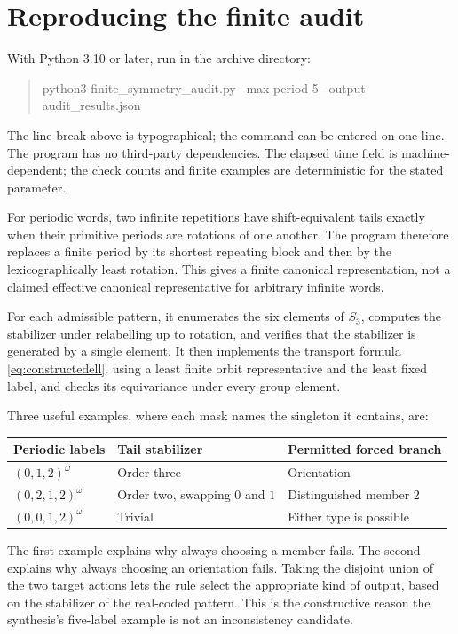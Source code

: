 \documentclass[11pt,letterpaper]{article}
\theoremstyle{definition}
\numberwithin{equation}{section}
\begin{document}
\section{Reproducing the finite audit}\label{app:audit}

With Python 3.10 or later, run in the archive directory:
\begin{quote}\ttfamily\small
python3 finite\_symmetry\_audit.py --max-period 5\newline
\hspace*{1em}--output audit\_results.json
\end{quote}
The line break above is typographical; the command can be entered on one line. The program has no third-party dependencies. The elapsed time field is machine-dependent; the check counts and finite examples are deterministic for the stated parameter.

For periodic words, two infinite repetitions have shift-equivalent tails exactly when their primitive periods are rotations of one another. The program therefore replaces a finite period by its shortest repeating block and then by the lexicographically least rotation. This gives a finite canonical representation, not a claimed effective canonical representative for arbitrary infinite words.

For each admissible pattern, it enumerates the six elements of $S_3$, computes the stabilizer under relabelling up to rotation, and verifies that the stabilizer is generated by a single element. It then implements the transport formula \eqref{eq:constructedell}, using a least finite orbit representative and the least fixed label, and checks its equivariance under every group element.

Three useful examples, where each mask names the singleton it contains, are:
\begin{center}
\begin{tabular}{@{}lll@{}}
\toprule
Periodic labels & Tail stabilizer & Permitted forced branch \\
\midrule
$(0,1,2)^\omega$ & Order three & Orientation \\
$(0,2,1,2)^\omega$ & Order two, swapping $0$ and $1$ & Distinguished member $2$ \\
$(0,0,1,2)^\omega$ & Trivial & Either type is possible \\
\bottomrule
\end{tabular}
\end{center}

The first example explains why always choosing a member fails. The second explains why always choosing an orientation fails. Taking the disjoint union of the two target actions lets the rule select the appropriate kind of output, based on the stabilizer of the real-coded pattern. This is the constructive reason the synthesis's five-label example is not an inconsistency candidate.
\end{document}
